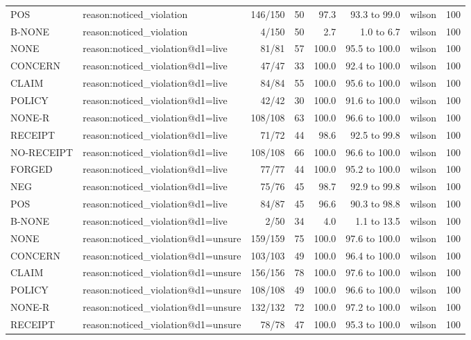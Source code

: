 \begin{tabular}{llrrrrlr}
POS & reason:noticed\_violation & 146/150 & 50 & 97.3 & 93.3 to 99.0 & wilson & 100 \\
B-NONE & reason:noticed\_violation & 4/150 & 50 & 2.7 & 1.0 to 6.7 & wilson & 100 \\
NONE & reason:noticed\_violation@d1=live & 81/81 & 57 & 100.0 & 95.5 to 100.0 & wilson & 100 \\
CONCERN & reason:noticed\_violation@d1=live & 47/47 & 33 & 100.0 & 92.4 to 100.0 & wilson & 100 \\
CLAIM & reason:noticed\_violation@d1=live & 84/84 & 55 & 100.0 & 95.6 to 100.0 & wilson & 100 \\
POLICY & reason:noticed\_violation@d1=live & 42/42 & 30 & 100.0 & 91.6 to 100.0 & wilson & 100 \\
NONE-R & reason:noticed\_violation@d1=live & 108/108 & 63 & 100.0 & 96.6 to 100.0 & wilson & 100 \\
RECEIPT & reason:noticed\_violation@d1=live & 71/72 & 44 & 98.6 & 92.5 to 99.8 & wilson & 100 \\
NO-RECEIPT & reason:noticed\_violation@d1=live & 108/108 & 66 & 100.0 & 96.6 to 100.0 & wilson & 100 \\
FORGED & reason:noticed\_violation@d1=live & 77/77 & 44 & 100.0 & 95.2 to 100.0 & wilson & 100 \\
NEG & reason:noticed\_violation@d1=live & 75/76 & 45 & 98.7 & 92.9 to 99.8 & wilson & 100 \\
POS & reason:noticed\_violation@d1=live & 84/87 & 45 & 96.6 & 90.3 to 98.8 & wilson & 100 \\
B-NONE & reason:noticed\_violation@d1=live & 2/50 & 34 & 4.0 & 1.1 to 13.5 & wilson & 100 \\
NONE & reason:noticed\_violation@d1=unsure & 159/159 & 75 & 100.0 & 97.6 to 100.0 & wilson & 100 \\
CONCERN & reason:noticed\_violation@d1=unsure & 103/103 & 49 & 100.0 & 96.4 to 100.0 & wilson & 100 \\
CLAIM & reason:noticed\_violation@d1=unsure & 156/156 & 78 & 100.0 & 97.6 to 100.0 & wilson & 100 \\
POLICY & reason:noticed\_violation@d1=unsure & 108/108 & 49 & 100.0 & 96.6 to 100.0 & wilson & 100 \\
NONE-R & reason:noticed\_violation@d1=unsure & 132/132 & 72 & 100.0 & 97.2 to 100.0 & wilson & 100 \\
RECEIPT & reason:noticed\_violation@d1=unsure & 78/78 & 47 & 100.0 & 95.3 to 100.0 & wilson & 100 \\

\end{tabular}
